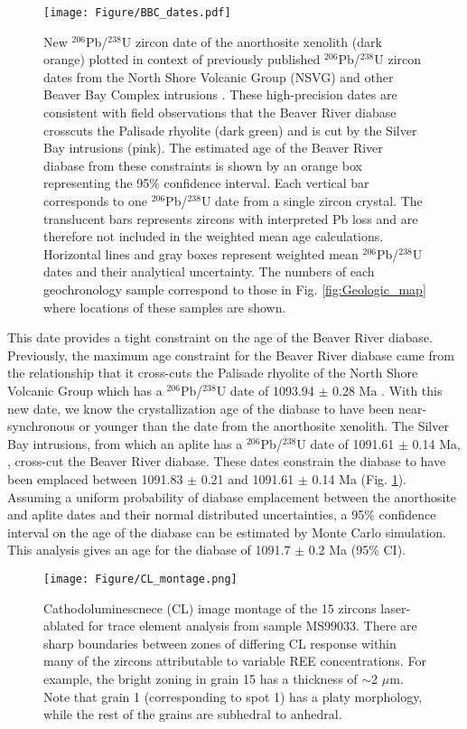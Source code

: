 \begin{figure}
\noindent\texttt{[image: Figure/BBC\_dates.pdf]}
\caption{\footnotesize{New $^{206}$Pb/$^{238}$U zircon date of the anorthosite xenolith (dark orange) plotted in context of previously published $^{206}$Pb/$^{238}$U zircon dates from the North Shore Volcanic Group (NSVG) and other Beaver Bay Complex intrusions \cite{Swanson-Hysell2019a, Swanson-Hysell2020a}. These high-precision dates are consistent with field observations that the Beaver River diabase crosscuts the Palisade rhyolite (dark green) and is cut by the Silver Bay intrusions (pink). The estimated age of the Beaver River diabase from these constraints is shown by an orange box representing the 95$\%$ confidence interval. Each vertical bar corresponds to one $^{206}$Pb/$^{238}$U date from a single zircon crystal. The translucent bars represents zircons with interpreted Pb loss and are therefore not included in the weighted mean age calculations. Horizontal lines and gray boxes represent weighted mean $^{206}$Pb/$^{238}$U dates and their analytical uncertainty. The numbers of each geochronology sample correspond to those in Fig. \ref{fig:Geologic_map} where locations of these samples are shown.}}
\label{fig:BBC_geochron}
\end{figure}

This date provides a tight constraint on the age of the Beaver River diabase. Previously, the maximum age constraint for the Beaver River diabase came from the relationship that it cross-cuts the Palisade rhyolite of the North Shore Volcanic Group which has a $^{206}$Pb/$^{238}$U date of 1093.94 $\pm$ 0.28 Ma  \cite{Swanson-Hysell2019a}. With this new date, we know the crystallization age of the diabase to have been near-synchronous or younger than the date from the anorthosite xenolith. The Silver Bay intrusions, from which an aplite has a $^{206}$Pb/$^{238}$U date of 1091.61 $\pm$ 0.14 Ma, \cite{Fairchild2017a}, cross-cut the Beaver River diabase. These dates constrain the diabase to have been emplaced between 1091.83 $\pm$ 0.21 and 1091.61 $\pm$ 0.14 Ma (Fig. \ref{fig:BBC_geochron}). Assuming a uniform probability of diabase emplacement between the anorthosite and aplite dates and their normal distributed uncertainties, a 95\% confidence interval on the age of the diabase can be estimated by Monte Carlo simulation. This analysis gives an age for the diabase of 1091.7 $\pm$ 0.2 Ma (95\% CI). 

\begin{figure}[h!]
\noindent\texttt{[image: Figure/CL\_montage.png]}
\centering
\caption{\footnotesize{Cathodoluminescnece (CL) image montage of the 15 zircons laser-ablated for trace element analysis from sample MS99033. There are sharp boundaries between zones of differing CL response within many of the zircons attributable to variable REE concentrations. For example, the bright zoning in grain 15 has a thickness of $\sim$2 $\mu$m. Note that grain 1 (corresponding to spot 1) has a platy morphology, while the rest of the grains are subhedral to anhedral. }}
\label{fig:CL_image}
\end{figure}

